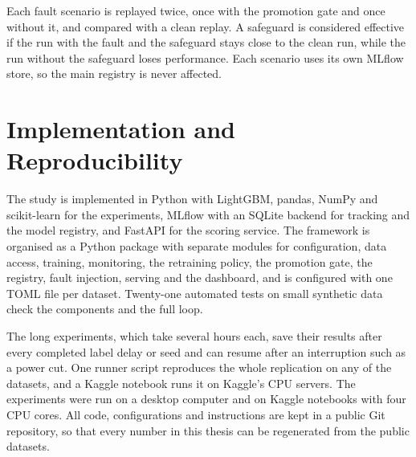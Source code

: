 Each fault scenario is replayed twice, once with the promotion gate and once without it, and compared with a clean replay. A safeguard is considered effective if the run with the fault and the safeguard stays close to the clean run, while the run without the safeguard loses performance. Each scenario uses its own MLflow store, so the main registry is never affected.

\section{Implementation and Reproducibility}

The study is implemented in Python with LightGBM, pandas, NumPy and scikit-learn for the experiments, MLflow with an SQLite backend for tracking and the model registry, and FastAPI for the scoring service. The framework is organised as a Python package with separate modules for configuration, data access, training, monitoring, the retraining policy, the promotion gate, the registry, fault injection, serving and the dashboard, and is configured with one TOML file per dataset. Twenty-one automated tests on small synthetic data check the components and the full loop.

The long experiments, which take several hours each, save their results after every completed label delay or seed and can resume after an interruption such as a power cut. One runner script reproduces the whole replication on any of the datasets, and a Kaggle notebook runs it on Kaggle's CPU servers. The experiments were run on a desktop computer and on Kaggle notebooks with four CPU cores. All code, configurations and instructions are kept in a public Git repository, so that every number in this thesis can be regenerated from the public datasets.
